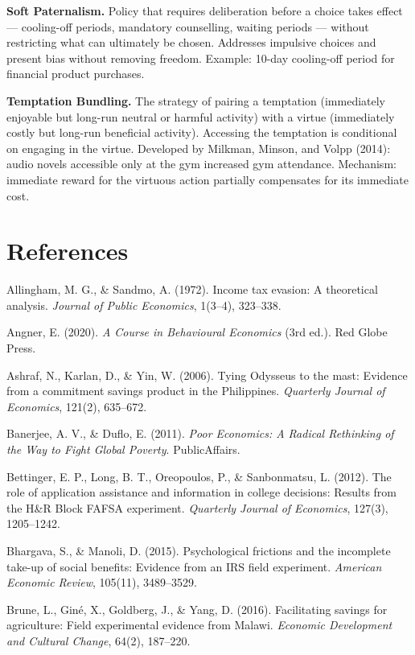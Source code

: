 \documentclass[12pt, letterpaper]{article}
\begin{document}
\textbf{Soft Paternalism.} Policy that requires deliberation before a choice takes effect --- cooling-off periods, mandatory counselling, waiting periods --- without restricting what can ultimately be chosen. Addresses impulsive choices and present bias without removing freedom. Example: 10-day cooling-off period for financial product purchases.

\textbf{Temptation Bundling.} The strategy of pairing a temptation (immediately enjoyable but long-run neutral or harmful activity) with a virtue (immediately costly but long-run beneficial activity). Accessing the temptation is conditional on engaging in the virtue. Developed by Milkman, Minson, and Volpp (2014): audio novels accessible only at the gym increased gym attendance. Mechanism: immediate reward for the virtuous action partially compensates for its immediate cost.

\medskip


\section*{References}


Allingham, M. G., \& Sandmo, A. (1972). Income tax evasion: A theoretical analysis. \textit{Journal of Public Economics}, 1(3--4), 323--338.

Angner, E. (2020). \textit{A Course in Behavioural Economics} (3rd ed.). Red Globe Press.

Ashraf, N., Karlan, D., \& Yin, W. (2006). Tying Odysseus to the mast: Evidence from a commitment savings product in the Philippines. \textit{Quarterly Journal of Economics}, 121(2), 635--672.

Banerjee, A. V., \& Duflo, E. (2011). \textit{Poor Economics: A Radical Rethinking of the Way to Fight Global Poverty}. PublicAffairs.

Bettinger, E. P., Long, B. T., Oreopoulos, P., \& Sanbonmatsu, L. (2012). The role of application assistance and information in college decisions: Results from the H\&R Block FAFSA experiment. \textit{Quarterly Journal of Economics}, 127(3), 1205--1242.

Bhargava, S., \& Manoli, D. (2015). Psychological frictions and the incomplete take-up of social benefits: Evidence from an IRS field experiment. \textit{American Economic Review}, 105(11), 3489--3529.

Brune, L., Giné, X., Goldberg, J., \& Yang, D. (2016). Facilitating savings for agriculture: Field experimental evidence from Malawi. \textit{Economic Development and Cultural Change}, 64(2), 187--220.
\end{document}
